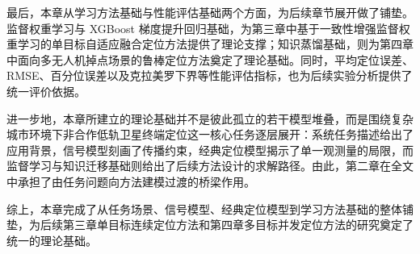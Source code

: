 最后，本章从学习方法基础与性能评估基础两个方面，为后续章节展开做了铺垫。监督权重学习与 XGBoost 梯度提升回归基础，为第三章中基于一致性增强监督权重学习的单目标自适应融合定位方法提供了理论支撑；知识蒸馏基础，则为第四章中面向多无人机掉点场景的鲁棒定位方法奠定了理论基础。同时，平均定位误差、RMSE、百分位误差以及克拉美罗下界等性能评估指标，也为后续实验分析提供了统一评价依据。

进一步地，本章所建立的理论基础并不是彼此孤立的若干模型堆叠，而是围绕复杂城市环境下非合作低轨卫星终端定位这一核心任务逐层展开：系统任务描述给出了应用背景，信号模型刻画了传播约束，经典定位模型揭示了单一观测量的局限，而监督学习与知识迁移基础则给出了后续方法设计的求解路径。由此，第二章在全文中承担了由任务问题向方法建模过渡的桥梁作用。

综上，本章完成了从任务场景、信号模型、经典定位模型到学习方法基础的整体铺垫，为后续第三章单目标连续定位方法和第四章多目标并发定位方法的研究奠定了统一的理论基础。
